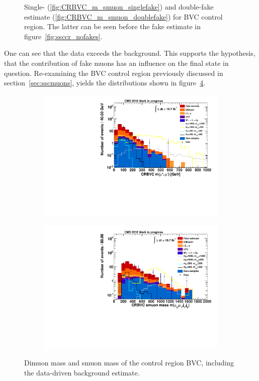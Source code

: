 \begin{figure}[h!]
  \caption{Single- (\ref{fig:CRBVC_m_smuon_singlefake}) and double-fake estimate (\ref{fig:CRBVC_m_smuon_doublefake}) for BVC control region. The latter can be seen before the fake estimate in figure~\ref{fig:ssccr_nofakes}.}
  \label{fig:fakeestimates}
\end{figure}

One can see that the data exceeds the background. This supports the hypothesis, that the contribution of fake muons has an influence on the final state in question. Re-examining the BVC control region previously discussed in section~\ref{sec:sscmuons}, yields the distributions shown in figure~\ref{fig:CRBVC}.

\begin{figure}[hb!]
  \centering
  \begin{subfigure}[b]{0.495\textwidth}
    \centering
    \includegraphics[width=\textwidth]{plots/CR6_m_mumu.pdf}
    \caption{\label{fig:CRBVC_m_mummu}}
  \end{subfigure}
  \begin{subfigure}[b]{0.495\textwidth}
    \centering
    \includegraphics[width=\textwidth]{plots/CR6_m_smuon.pdf}
    \caption{\label{fig:CRBVC_m_smuon}}
  \end{subfigure}

  \caption{Dimuon mass and smuon mass of the control region BVC, including the data-driven background estimate.}
  \label{fig:CRBVC}
\end{figure}

